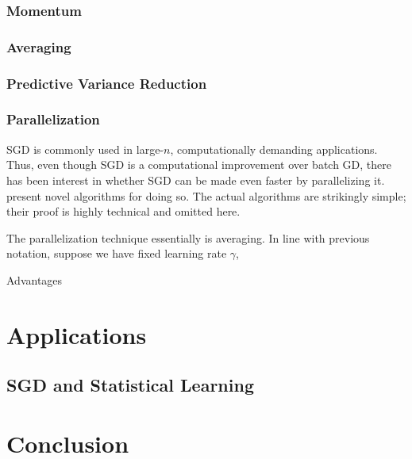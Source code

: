 \documentclass{article}
\begin{document}
\cite{shalev2011pegasos}

\subsubsection{Momentum}

\cite{polyak1992acceleration}
\cite{nesterov}

\subsubsection{Averaging}

\subsubsection{Predictive Variance Reduction}

\subsubsection{Parallelization}

SGD is commonly used in large-$n$, computationally demanding applications. Thus,
even though SGD is a computational improvement over batch GD, there has been
interest in whether SGD can be made even faster by parallelizing it.
\cite{zinkevich2010parallelized} present novel algorithms for doing so. The
actual algorithms are strikingly simple; their proof is highly technical and
omitted here.

The parallelization technique essentially is averaging. In line with previous
notation, suppose we have fixed learning rate $\gamma$, 

Advantages

\section{Applications}

\subsection{SGD and Statistical Learning}

\section{Conclusion}

\printbibliography
\end{document}
